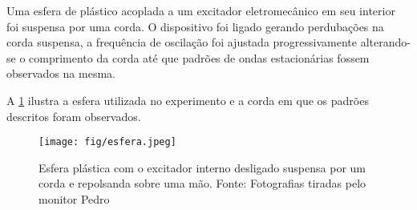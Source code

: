 Uma esfera de plástico acoplada a um excitador eletromecânico em seu interior foi suspensa por uma corda. O dispositivo foi ligado gerando perdubações na corda suspensa, a frequência de oscilação foi ajustada progressivamente alterando-se o comprimento da corda até que padrões de ondas estacionárias fossem observados na mesma. 

A \cref{fig:esfera} ilustra a esfera utilizada no experimento e a corda em que os padrões descritos foram observados.

\begin{figure}[H]
    \centering
    \texttt{[image: fig/esfera.jpeg]}
    \caption{Esfera plástica com o excitador interno desligado suspensa por um corda e repolsanda sobre uma mão. Fonte: Fotografias tiradas pelo monitor Pedro}
    \label{fig:esfera}
\end{figure}
